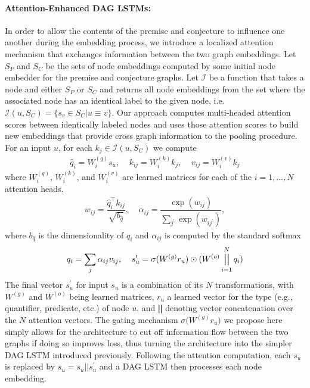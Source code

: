 \documentclass{article}
\begin{document}
\paragraph{Attention-Enhanced DAG LSTMs:} In order to allow the contents of the premise and conjecture to influence one another during the embedding process, we introduce a localized attention mechanism that exchanges information between the two graph embeddings. Let $S_P$ and $S_C$ be the sets of node embeddings computed by some initial node embedder for the premise and conjecture graphs. Let $\mathcal{I}$ be a function that takes a node and either $S_P$ or $S_C$ and returns all node embeddings from the set where the associated node has an identical label to the given node, i.e. $\mathcal{I}(u, S_C) = \{ s_v \in S_C | u \equiv v\}$. Our approach computes multi-headed attention scores \cite{vaswani2017attention} between identically labeled nodes and uses those attention scores to build new embeddings that provide cross graph information to the pooling procedure. For an input $u$, for each $k_j \in \mathcal{I}(u, S_C)$ we compute
\begin{gather*}
    \hat{q}_{i} = W^{(q)}_{i} s_u,\;\;\;\;k_{ij} = W^{(k)}_{i} k_{j},\;\;\;\;v_{ij} = W^{(v)}_{i} k_j
\end{gather*}
where $W^{(q)}_{i}$, $W^{(k)}_{i}$, and $W^{(v)}_{i}$ are learned matrices for each of the $i = 1, \ldots, N$ attention heads.
\begin{gather*}
    w_{ij} = \dfrac{\hat{q}_{i}^\top k_{ij}}{\sqrt{b_{\hat{q}}}},\;\;\;\;\alpha_{ij} = \dfrac{\exp{(w_{ij})}}{\sum_{j^\prime}\exp(w_{ij^\prime})}, 
\end{gather*}
where $b_{\hat{q}}$ is the dimensionality of $\hat{q}_i$ and $\alpha_{ij}$ is computed by the standard softmax
\begin{gather*}
    q_{i} = \sum_{j} \alpha_{ij} v_{ij},\;\;\;\;s_u^\prime = \sigma(W^{(g)}r_u) \odot ( W^{(o)} \bigparallel_{i = 1}^{N} q_i)
\end{gather*}
The final vector $s_u^\prime$ for input $s_u$ is a combination of its $N$ transformations, with $W^{(g)}$ and $W^{(o)}$ being learned matrices, $r_u$ a learned vector for the type (e.g., quantifier, predicate, etc.) of node $u$, and $\bigparallel$ denoting vector concatenation over the $N$ attention vectors. The gating mechanism $\sigma\big(W^{(g)} r_u)$ we propose here simply allows for the architecture to cut off information flow between the two graphs if doing so improves loss, thus turning the architecture into the simpler DAG LSTM introduced previously.
Following the attention computation, each $s_u$ is replaced by $\bar{s}_u = s_u || s^\prime_u$ and a DAG LSTM then processes each node embedding.
\end{document}
